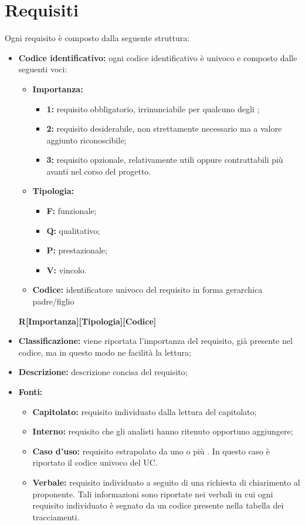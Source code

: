 \section{Requisiti}
Ogni requisito è composto dalla seguente struttura: 
\begin{itemize}
	\item \textbf{Codice identificativo:} ogni codice identificativo è univoco e composto dalle seguenti voci:
	\begin{itemize}
	\item \textbf{Importanza:}
	\begin{itemize}
	\item \textbf{1:} requisito obbligatorio, irrinunciabile per qualcuno degli ;
	\item \textbf{2:} requisito desiderabile, non strettamente necessario ma a valore aggiunto riconoscibile;
	\item \textbf{3:} requisito opzionale, relativamente utili oppure contrattabili più avanti nel corso del progetto.
	\end{itemize}
	\item \textbf{Tipologia:}
	\begin{itemize}
	\item \textbf{F:} funzionale;
	\item \textbf{Q:} qualitativo;
	\item \textbf{P:} prestazionale;
	\item \textbf{V:} vincolo.
	\end{itemize}
	\item \textbf{Codice:} identificatore univoco del requisito in forma gerarchica padre/figlio
	\end{itemize}
	\begin{center}
	\textbf{R[Importanza][Tipologia][Codice]}
	\end{center}
	\item \textbf{Classificazione:} viene riportata l'importanza del requisito, già presente nel codice, ma in questo modo ne facilità la lettura;
	\item \textbf{Descrizione:} descrizione concisa del requisito;
	\item \textbf{Fonti:}
	\begin{itemize}
	\item \textbf{Capitolato:} requisito individuato dalla lettura del capitolato;
	\item \textbf{Interno:} requisito che gli analisti hanno ritenuto opportuno aggiungere;
	\item \textbf{Caso d'uso:} requisito estrapolato da uno o più . In questo caso è riportato il codice univoco del UC.
	\item \textbf{Verbale:} requisito individuato a seguito di una richiesta di chiarimento al proponente. Tali informazioni sono riportate nei verbali in cui ogni requisito individuato è segnato da un codice presente nella tabella dei tracciamenti.
	\end{itemize}
\end{itemize}
\newpage

\newpage

\newpage

\newpage

\newpage
